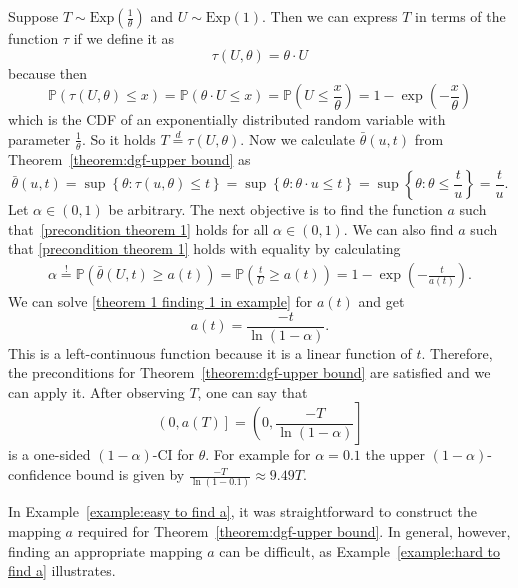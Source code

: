 \begin{example}\label{example:easy to find a}
	Suppose $T \sim \text{Exp} \left( \frac{1}{\theta} \right)$ and $U \sim \text{Exp}(1)$. Then we can express $T$ in terms of the function $\tau$ if we define it as 
	\[ \tau (U , \theta ) = \theta \cdot U\]
	because then 
	\begin{equation} \label{exp distn rescale}
		\mathbb{P} (\tau (U , \theta ) \leq x) = 
		\mathbb{P} \left( \theta \cdot U \leq x \right) =
		\mathbb{P} \left( U \leq \frac{x}{\theta} \right) = 
		1 - \exp \left( - \frac{x}{\theta} \right)
	\end{equation}
	which is the CDF of an exponentially distributed random variable with parameter $ \frac{1}{\theta}$. So it holds $T \overset{d}{=} \tau (U, \theta)$. Now we calculate $\bar \theta (u, t)$ from Theorem~\ref{theorem:dgf-upper bound} as
	\[
		\bar \theta (u, t) = 
		\sup \left\{ \theta : \tau (u, \theta) \leq t \right\}
		=
		\sup \left\{ \theta : \theta \cdot u \leq t \right\}
		=
		\sup \left\{ \theta : \theta \leq \frac{t}{u} \right\}
		=
		\frac{t}{u}.
	\]
	Let $\alpha \in (0, 1)$ be arbitrary.
	The next objective is to find the function $a$ such that~\eqref{precondition theorem 1} holds for all $\alpha \in (0, 1)$. We can also find $a$ such that \eqref{precondition theorem 1} holds with equality by calculating
	\begin{align} \label{theorem 1 finding 1 in example}
		\alpha 
		\overset{!}{=}
		\mathbb{P} \left( \bar \theta (U, t) \geq a(t) \right)
		=
		\mathbb{P} \left( \frac{t}{U} \geq a(t) \right)
		=
		1 - \exp \left( - \frac{t}{a(t)} \right).
	\end{align}
	We can solve \eqref{theorem 1 finding 1 in example} for $a(t)$ and get
	\[
		a(t) = \frac{- t}{\ln(1- \alpha)}.
	\]
	This is a left-continuous function because it is a linear function of \(t\). Therefore, the preconditions for Theorem~\ref{theorem:dgf-upper bound} are satisfied and we can apply it.
	After observing $T$, one can say that 
	\[
		\left( 0, a(T) \right] = \left( 0,  \frac{-T}{\ln(1- \alpha)} \right]
	\]
	is a one-sided $(1-\alpha)$-CI for $\theta$. For example for $\alpha = 0.1$ the upper $(1-\alpha)$-confidence bound is given by $\frac{-T}{\ln(1 - 0.1)} \approx 9.49 T$.
\end{example}


In Example~\ref{example:easy to find a}, it was straightforward to construct the mapping \(a\) required for Theorem~\ref{theorem:dgf-upper bound}. In general, however, finding an appropriate mapping \(a\) can be difficult, as Example~\ref{example:hard to find a} illustrates.

